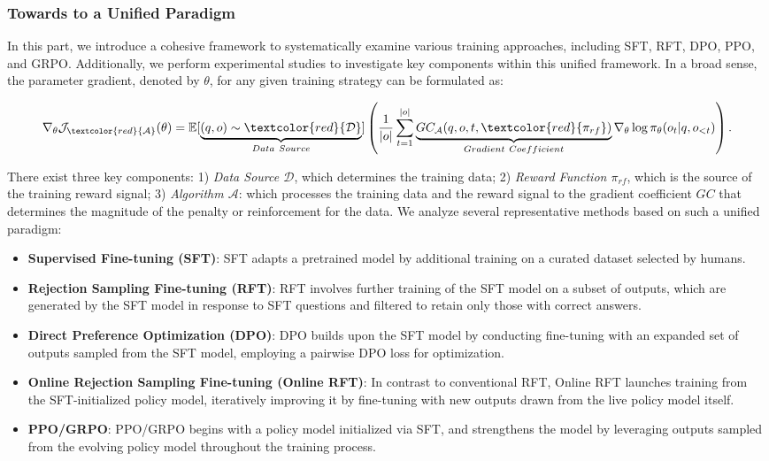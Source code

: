 \begin{itemize}[topsep=0pt]
\begin{itemize}[topsep=0pt]
\subsubsection{Towards to a Unified Paradigm} In this part, we introduce a cohesive framework to systematically examine various training approaches, including SFT, RFT, DPO, PPO, and GRPO. Additionally, we perform experimental studies to investigate key components within this unified framework. In a broad sense, the parameter gradient, denoted by $\theta$, for any given training strategy can be formulated as:

\begin{equation}
    \nabla_{\theta}\mathcal{J}_{\textcolor{red}{\mathcal{A}}}(\theta) = \mathbb{E}[\underbrace{(q,o) \sim \textcolor{red}{\mathcal{D}}}_{Data \ Source}]\left( \frac{1}{|o|} \sum_{t=1}^{|o|}  \underbrace{GC_{{\mathcal{A}}}(q, o, t, \textcolor{red}{\pi_{{rf}}})}_{Gradient \ Coefficient}  \nabla_{\theta}\log \pi_{\theta}(o_t | q, o_{<t})\right).
\label{eq:objective}
\end{equation}

There exist three key components: 1) \textit{Data Source $\mathcal{D}$}, which determines the training data; 2) \textit{Reward Function $\pi_{{rf}}$}, which is the source of the training reward signal; 3) \textit{Algorithm $\mathcal{A}$}: which processes the training data and the reward signal to the gradient coefficient $GC$ that determines the magnitude of the penalty or reinforcement for the data. We analyze several representative methods based on such a unified paradigm:

\begin{itemize}
    \item  \textbf{Supervised Fine-tuning (SFT)}: SFT adapts a pretrained model by additional training on a curated dataset selected by humans.
    \item \textbf{Rejection Sampling Fine-tuning (RFT)}: RFT involves further training of the SFT model on a subset of outputs, which are generated by the SFT model in response to SFT questions and filtered to retain only those with correct answers.
    \item \textbf{Direct Preference Optimization (DPO)}: DPO builds upon the SFT model by conducting fine-tuning with an expanded set of outputs sampled from the SFT model, employing a pairwise DPO loss for optimization.
    \item \textbf{Online Rejection Sampling Fine-tuning (Online RFT)}: In contrast to conventional RFT, Online RFT launches training from the SFT-initialized policy model, iteratively improving it by fine-tuning with new outputs drawn from the live policy model itself.
    \item \textbf{PPO/GRPO}: PPO/GRPO begins with a policy model initialized via SFT, and strengthens the model by leveraging outputs sampled from the evolving policy model throughout the training process.
\end{itemize}


\end{itemize}
\end{itemize}

